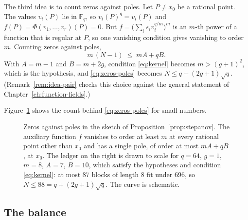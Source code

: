 \documentclass[11pt]{amsbook}
\theoremstyle{plain}
\theoremstyle{definition}
\theoremstyle{remark}
\numberwithin{equation}{section}
\numberwithin{figure}{chapter}
\numberwithin{table}{chapter}
\newcommand{\F}{\mathbb{F}}
\begin{document}
The third idea is to count zeros against poles. Let $P \ne x_0$ be a
rational point. The values $v_i(P)$ lie in $\F_q$, so $v_i(P)^q = v_i(P)$
and $f(P) = \Phi(v_1, \dots, v_r)(P) = 0$. But
$f = \bigl(\sum_i s_i v_i^{q/m}\bigr)^m$ is an $m$-th power of a
function that is regular at $P$, so one vanishing condition gives
vanishing to order $m$. Counting zeros against poles,
\begin{equation}\label{eq:zeros-poles}
  m\,(N - 1) \;\le\; mA + qB .
\end{equation}
With $A = m - 1$ and $B = m + 2g$, condition \eqref{eq:kernel}
becomes $m > (g+1)^2$, which is the hypothesis, and
\eqref{eq:zeros-poles} becomes $N \le q + (2g+1)\sqrt q$.
(Remark~\ref{rem:idea-pair} checks this choice against the general
statement of Chapter~\ref{ch:function-fields}.)

Figure~\ref{fig:idea-zero-pole-budget} shows the count behind
\eqref{eq:zeros-poles} for small numbers.
\begin{figure}[tbp]
\centering
{}
\caption{Zeros against poles in the sketch of
Proposition~\ref{prop:stepanov}. The auxiliary function $f$ vanishes
to order at least $m$ at every rational point other than $x_0$ and
has a single pole, of order at most $mA+qB$, at $x_0$. The ledger on
the right is drawn to scale for $q=64$, $g=1$, $m=8$, $A=7$, $B=10$,
which satisfy the hypotheses and condition \eqref{eq:kernel}: at
most $87$ blocks of length $8$ fit under $696$, so
$N\le88=q+(2g+1)\sqrt q$. The curve is schematic.}
\label{fig:idea-zero-pole-budget}
\end{figure}

\subsection*{The balance}
\end{document}
